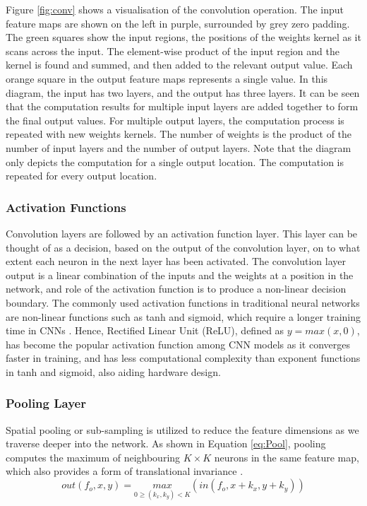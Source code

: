 \documentclass[12pt]{article}
\begin{document}
Figure \ref{fig:conv} shows a visualisation of the convolution operation. The input feature maps are shown on the left in purple, surrounded by grey zero padding. The green squares show the input regions, the positions of the weights kernel as it scans across the input. The element-wise product of the input region and the kernel is found and summed, and then added to the relevant output value. Each orange square in the output feature maps represents a single value. In this diagram, the input has two layers, and the output has three layers. It can be seen that the computation results for multiple input layers are added together to form the final output values. For multiple output layers, the computation process is repeated with new weights kernels. The number of weights is the product of the number of input layers and the number of output layers. Note that the diagram only depicts the computation for a single output location. The computation is repeated for every output location. 


\subsubsection{Activation Functions}
\label{sec:Background-CNN-Activation}

Convolution layers are followed by an activation function layer. This layer can be thought of as a decision, based on the output of the convolution layer, on to what extent each neuron in the next layer has been activated. The convolution layer output is a linear combination of the inputs and the weights at a position in the network, and role of the activation function is to produce a non-linear decision boundary. The commonly used activation functions in traditional neural networks are non-linear functions such as tanh and sigmoid, which require a longer training time in CNNs \cite{AlexNet}. Hence, Rectified Linear Unit (ReLU), defined as $y = max(x,0)$, has become the popular activation function among CNN models as it converges faster in training, and has less computational complexity than exponent functions in tanh and sigmoid, also aiding hardware design.

\subsubsection{Pooling Layer}
\label{sec:Background-CNN-Pool}


Spatial pooling or sub-sampling is utilized to reduce the feature dimensions as we traverse deeper into the network. As shown in Equation \ref{eq:Pool}, pooling computes the maximum of neighbouring $K\times K$ neurons in the same feature map, which also provides a form of translational invariance \cite{PoolAnalysis}. 
\begin{equation}
out(f_o,x,y)=\underset{0\geqslant (k_x,k_y)<K}{max}(in(f_o,x+k_x,y+k_y))
\label{eq:Pool}
\end{equation}
\end{document}
